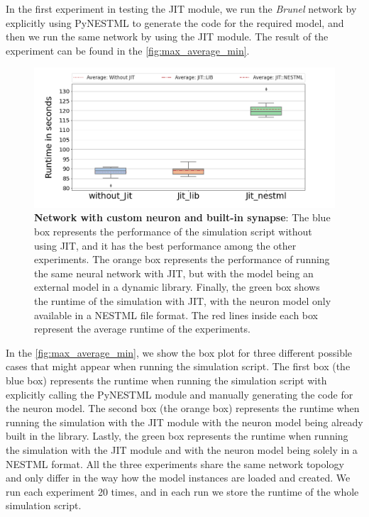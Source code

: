 In the first experiment in testing the JIT module, we run the \emph{Brunel} network by explicitly using PyNESTML to generate the code for the required model, and then we run the same network by using the JIT module. The result of the experiment can be found in the \autoref{fig:max_average_min}.

\begin{figure}[ht!]
    \centering
    \includegraphics[width=\textwidth]{src/pic/box_plot_three.png}
    \caption{\textbf{Network with custom neuron and built-in synapse}: The blue box represents the performance of the simulation script without using JIT, and it has the best performance among the other experiments. The orange box represents the performance of running the same neural network with JIT, but with the model being an external model in a dynamic library. Finally, the green box shows the runtime of the simulation with JIT, with the neuron model only available in a NESTML file format. The red lines inside each box represent the average runtime of the experiments.}
    \label{fig:max_average_min}
\end{figure}

In the \autoref{fig:max_average_min}, we show the box plot for three different possible cases that might appear when running the simulation script. The first box (the blue box) represents the runtime when running the simulation script with explicitly calling the PyNESTML module and manually generating the code for the neuron model. The second box (the orange box) represents the runtime when running the simulation with the JIT module with the neuron model being already built in the library. Lastly, the green box represents the runtime when running the simulation with the JIT module and with the neuron model being solely in a NESTML format. All the three experiments share the same network topology and only differ in the way how the model instances are loaded and created. We run each experiment 20 times, and in each run we store the runtime of the whole simulation script.

